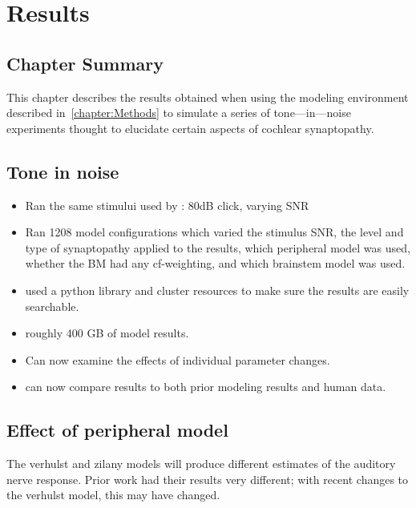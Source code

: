 \chapter{Results}
\label{chapter:Results}
\thispagestyle{myheadings}

\graphicspath{{5_Results/Figures/}}
\section{Chapter Summary} %
\label{sec:chapter_summary}
This chapter describes the results obtained when using the modeling environment described in~\autoref{chapter:Methods} to simulate a series of tone---in---noise experiments thought to elucidate certain aspects of cochlear synaptopathy. 


\section{Tone in noise} %
\label{sec:tone_in_noise}
\begin{itemize}
	\item Ran the same stimului used by \cite{Mehraei2015Auditory}: 80dB click, varying SNR
	\item Ran 1208 model configurations which varied  the stimulus SNR, the level and type of synaptopathy applied to the results, which peripheral model was used, whether the BM had any cf-weighting, and which brainstem model was used. 
	\item used a python library and cluster resources to make sure the results are easily searchable. 
	\item roughly 400 GB of model results.
	\item Can now examine the effects of individual parameter changes. 
	\item can now compare results to both prior modeling results and human data. 
\end{itemize}
\section{Effect of peripheral model} %
\label{sec:effect_of_peripheral_model}
The verhulst and zilany models will produce different estimates of the auditory nerve response. Prior work had their results very different; with recent changes to the verhulst model, this may have changed.

